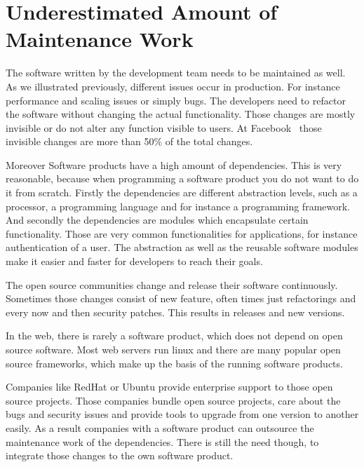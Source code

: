 \section{Underestimated Amount of Maintenance Work}

The software written by the development team needs to be maintained as well. As we
illustrated previously, different issues occur in production. For instance performance and
scaling issues or simply bugs. The developers need to refactor the software without
changing the actual functionality. Those changes are mostly invisible or do not alter any
function visible to users. At Facebook~\cite{dev_at_fb} those invisible changes are more
than 50\% of the total changes.

Moreover Software products have a high amount of dependencies. This is very reasonable, because when programming a software product you do not want to do it from scratch. Firstly the
dependencies are different abstraction levels, such as a processor, a programming language
and for instance a programming framework. And secondly the dependencies are modules which
encapsulate certain functionality. Those are very common functionalities for
applications, for instance authentication of a user. The abstraction as well as the
reusable software modules make it easier and faster for developers to reach their goals.

The open source communities change and release their software continuously. Sometimes
those changes consist of new feature, often times just refactorings and every now and then
security patches. This results in releases and new versions.

In the web, there is rarely a software product, which does not depend on open source
software. Most web servers run linux and there are many popular open source
frameworks, which make up the basis of the running software products.

Companies like RedHat or Ubuntu provide enterprise support to those open source
projects. Those companies bundle open source projects, care about the bugs and
security issues and provide tools to upgrade from one version to another easily. As a
result companies with a software product can outsource the maintenance work of the
dependencies. There is still the need though, to integrate those changes to the own
software product.

